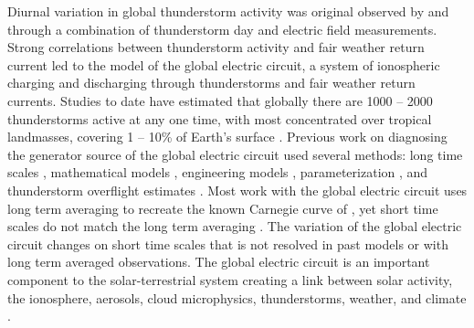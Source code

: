 Diurnal variation in global thunderstorm activity was original observed by \citet{Wilson1921} and \citet{Whipple1929} through a combination of thunderstorm day and electric field measurements.
Strong correlations between thunderstorm activity and fair weather return current led to the model of the global electric circuit, a system of ionospheric charging and discharging through thunderstorms and fair weather return currents. 
Studies to date have estimated that globally there are 1000 -- 2000 thunderstorms active at any one time, with most concentrated over tropical landmasses, covering 1 -- 10\% of Earth's surface \citep{Markson1978, Rycroft2011a, Singh2011a}.
Previous work on diagnosing the generator source of the global electric circuit used several methods:  long time scales \citep{Tinsley2007, Liu2010}, mathematical models \citep{Kasemir1977, Hays1979, Roble1991}, engineering models \citep{Ogawa1985, Kartalev2004, Rycroft2006}, parameterization \citep{Price1992, Williams1985}, and thunderstorm overflight estimates \citep{Mach2011}.
Most work with the global electric circuit uses long term averaging to recreate the known Carnegie curve of \citet{Whipple1929}, yet short time scales do not match the long term averaging \citep{Holzworth1984a}.
The variation of the global electric circuit changes on short time scales that is not resolved in past models or with long term averaged observations.
The global electric circuit is an important component to the solar-terrestrial system creating a link between solar activity, the ionosphere, aerosols, cloud microphysics, thunderstorms, weather, and climate \citep{Tinsley2007, Holzworth1986}.

